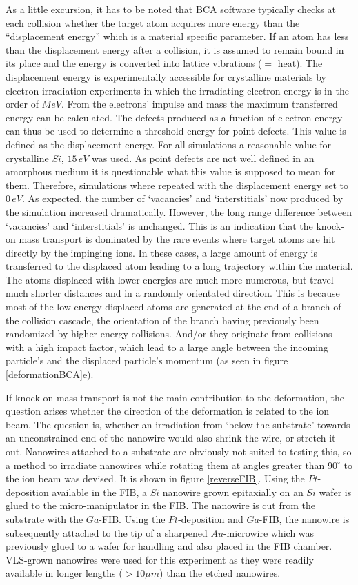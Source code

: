 \documentclass[12pt,
paper=a4,				
DIV=calc,		  %
BCOR=16mm,	  %
headinclude,
openany
]{scrbook}
\begin{document}
As a little excursion, it has to be noted that BCA software typically checks at each collision whether the target atom acquires more energy than the ``displacement energy'' which is a material specific parameter. If an atom has less than the displacement energy after a collision, it is assumed to remain bound in its place and the energy is converted into lattice vibrations ($=$ heat). The displacement energy is experimentally accessible for crystalline materials by electron irradiation experiments in which the irradiating electron energy is in the order of $MeV$. From the electrons' impulse and mass the maximum transferred energy can be calculated. The defects produced as a function of electron energy can thus be used to determine a threshold energy for point defects. This value is defined as the displacement energy. For all simulations a reasonable value for crystalline $Si$, $15\,eV$ was used. As point defects are not well defined in an amorphous medium it is questionable what this value is supposed to mean for them. Therefore, simulations where repeated with the displacement energy set to $0\,eV$. As expected, the number of `vacancies' and `interstitials' now produced by the simulation increased dramatically. However, the long range difference between `vacancies' and `interstitials' is unchanged. This is an indication that the knock-on mass transport is dominated by the rare events where target atoms are hit directly by the impinging ions. In these cases, a large amount of energy is transferred to the displaced atom leading to a long trajectory within the material. The atoms displaced with lower energies are much more numerous, but travel much shorter distances and in a randomly orientated direction. This is because most of the low energy displaced atoms are generated at the end of a branch of the collision cascade, the orientation of the branch having previously been randomized by higher energy collisions. And/or they originate from collisions with a high impact factor, which lead to a large angle between the incoming particle's and the displaced particle's momentum (as seen in figure \ref{deformationBCA}e).

If knock-on mass-transport is not the main contribution to the deformation, the question arises whether the direction of the deformation is related to the ion beam. The question is, whether an irradiation from `below the substrate' towards an unconstrained end of the nanowire would also shrink the wire, or stretch it out. Nanowires attached to a substrate are obviously not suited to testing this, so a method to irradiate nanowires while rotating them at angles greater than $90^\circ$ to the ion beam was devised. It is shown in figure \ref{reverseFIB}. Using the $Pt$-deposition available in the FIB, a $Si$ nanowire grown epitaxially on an $Si$ wafer is glued to the micro-manipulator in the FIB. The nanowire is cut from the substrate with the $Ga$-FIB. Using the $Pt$-deposition and $Ga$-FIB, the nanowire is subsequently attached to the tip of a sharpened $Au$-microwire which was previously glued to a wafer for handling and also placed in the FIB chamber. VLS-grown nanowires were used for this experiment as they were readily available in longer lengths ($>10\mu m$) than the etched nanowires.
\end{document}
